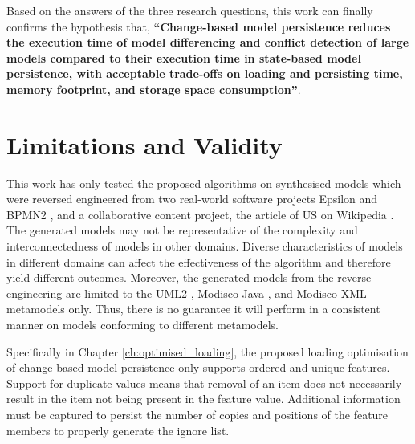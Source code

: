 Based on the answers of the three research questions, this work can finally confirms the hypothesis that, 
\textbf{``Change-based model persistence reduces the execution time of model differencing and conflict detection of large models compared to their execution time in state-based model persistence, with acceptable trade-offs on loading and persisting time, memory footprint, and storage space consumption''}. 


\section{Limitations and Validity}
\label{sec:limitation_and_Threat_to_validity}
This work has only tested the proposed algorithms on synthesised models which were reversed engineered from two real-world software projects Epsilon \cite{eclipse2018epsilongit} and BPMN2 \cite{eclipse2018bpmn2git}, and a collaborative content project, the article of US on Wikipedia \cite{wikipedia2018us}. The generated models may not be representative of the complexity and interconnectedness of models in other domains. Diverse characteristics of models in different domains can affect the effectiveness of the algorithm and therefore yield different outcomes. Moreover, the generated models from the reverse engineering are limited to the UML2 \cite{eclipse2017uml2}, Modisco Java \cite{eclipse2018modiscojava}, and Modisco XML \cite{eclipse2018modiscoxml} metamodels only. Thus, there is no guarantee it will perform in a consistent manner on models conforming to different metamodels.

Specifically in Chapter \ref{ch:optimised_loading}, the proposed loading optimisation of change-based model persistence only supports ordered and unique features. Support for duplicate values means that removal of an item does not necessarily result in the item not being present in the feature value. Additional information must be captured to persist the number of copies and positions of the feature members to properly generate the ignore list. 

